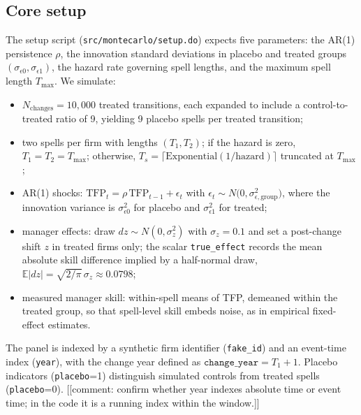\documentclass[11pt,a4paper]{article}
\begin{document}
\subsection{Core setup}
The setup script (\texttt{src/montecarlo/setup.do}) expects five parameters: the AR(1) persistence $\rho$, the innovation standard deviations in placebo and treated groups $(\sigma_{\epsilon0},\sigma_{\epsilon1})$, the hazard rate governing spell lengths, and the maximum spell length $T_{\max}$. We simulate:
\begin{itemize}
 \item $N_{\text{changes}}=10{,}000$ treated transitions, each expanded to include a control-to-treated ratio of 9, yielding 9 placebo spells per treated transition;
 \item two spells per firm with lengths $(T_1,T_2)$; if the hazard is zero, $T_1=T_2=T_{\max}$; otherwise, $T_s=\lceil \text{Exponential}(1/\text{hazard})\rceil$ truncated at $T_{\max}$;
 \item AR(1) shocks: $\text{TFP}_{t}=\rho\,\text{TFP}_{t-1}+\epsilon_t$ with $\epsilon_t\sim N\big(0, \sigma_{\epsilon,\text{group}}^2\big)$, where the innovation variance is $\sigma_{\epsilon0}^2$ for placebo and $\sigma_{\epsilon1}^2$ for treated;
 \item manager effects: draw $dz\sim N(0,\sigma_z^2)$ with $\sigma_z=0.1$ and set a post-change shift $z$ in treated firms only; the scalar \texttt{true\_effect} records the mean absolute skill difference implied by a half-normal draw, $\mathbb E|dz|=\sqrt{2/\pi}\,\sigma_z\approx 0.0798$;
 \item measured manager skill: within-spell means of TFP, demeaned within the treated group, so that spell-level skill embeds noise, as in empirical fixed-effect estimates.
\end{itemize}
The panel is indexed by a synthetic firm identifier (\texttt{fake\_id}) and an event-time index (\texttt{year}), with the change year defined as $\texttt{change\_year}=T_1+1$. Placebo indicators (\texttt{placebo}=1) distinguish simulated controls from treated spells (\texttt{placebo}=0). [[comment: confirm whether year indexes absolute time or event time; in the code it is a running index within the window.]]
\end{document}

